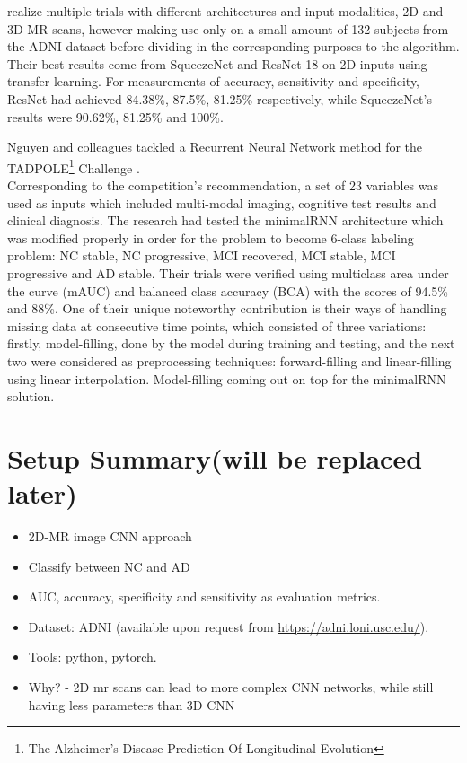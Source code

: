 \documentclass[a4paper, 12pt]{article}
\begin{document}
\cite{10.1117/1.JMI.8.2.024503} realize multiple trials with different architectures and input modalities, 2D and 3D MR scans,
however making use only on a small amount of 132 subjects from the ADNI dataset before dividing in the corresponding purposes
to the algorithm. Their best results come from SqueezeNet and ResNet-18 on 2D inputs using transfer learning.
For measurements of accuracy, sensitivity and specificity, ResNet had achieved 84.38\%, 87.5\%, 81.25\% respectively, while
SqueezeNet's results were 90.62\%, 81.25\% and 100\%.


Nguyen and colleagues tackled a Recurrent Neural Network method for the TADPOLE\footnote{The Alzheimer's Disease Prediction
    Of Longitudinal Evolution} Challenge \cite{NGUYEN2020117203}. \\
Corresponding to the competition's recommendation, a set of 23 variables was used as inputs which included multi-modal
imaging, cognitive test results and clinical diagnosis. The research had tested the minimalRNN architecture \cite{Chen2017MinimalRNNTM}
which was modified properly in order for the problem to become 6-class labeling problem: NC stable, NC progressive, MCI recovered,
MCI stable, MCI progressive and AD stable. Their trials were verified using multiclass area under the curve (mAUC) and balanced
class accuracy (BCA) with the scores of 94.5\% and 88\%. One of their unique noteworthy contribution is their ways of
handling missing data at consecutive time points, which consisted of three variations: firstly, model-filling, done by the model
during training and testing, and the next two were considered as preprocessing techniques: forward-filling and linear-filling using linear
interpolation. Model-filling coming out on top for the minimalRNN solution.

\newpage
\section{Setup Summary(will be replaced later)}
\begin{itemize}
    \item 2D-MR image CNN approach
    \item Classify between NC and AD
    \item AUC, accuracy, specificity and sensitivity as evaluation metrics.
    \item Dataset: ADNI (available upon request from \url{https://adni.loni.usc.edu/}).
    \item Tools: python, pytorch.
    \item Why? - 2D mr scans can lead to more complex CNN networks, while still having less parameters than 3D CNN
\end{itemize}
\end{document}
